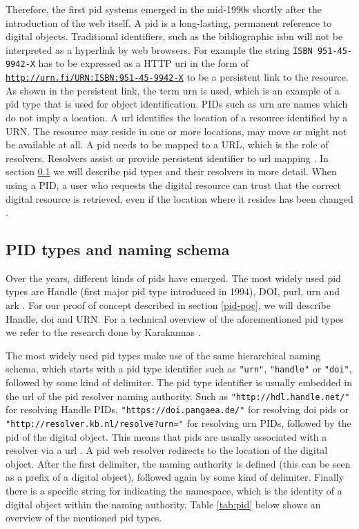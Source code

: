 Therefore, the first \gls{pid} systems emerged in the mid-1990s shortly after the introduction of the web itself. A \gls{pid} is a long-lasting, permanent reference to digital objects. Traditional identifiers, such as the bibliographic \gls{isbn} will not be interpreted as a hyperlink by web browsers. For example the string \texttt{ISBN 951-45-9942-X} has to be expressed as a HTTP \gls{uri} in the form of \texttt{\url{http://urn.fi/URN:ISBN:951-45-9942-X}} to be a persistent link to the resource. As shown in the persistent link, the term \gls{urn} is used, which is an example of a \gls{pid} type that is used for object identification. 
PIDs such as \gls{urn} are names which do not imply a location. A \gls{url} identifies the location of a resource identified by a URN. The resource may reside in one or more locations, may move or might not be available at all. A \gls{pid} needs to be mapped to a URL, which is the role of resolvers. Resolvers assist or provide persistent identifier to \gls{url} mapping \cite{rfc1737}. In section \ref{pid-types} we will describe \gls{pid} types and their resolvers in more detail. When using a PID, a user who requests the digital resource can trust that the correct digital resource is retrieved, even if the location where it resides has been changed \cite{pid-oview}.

\subsection{PID types and naming schema}\label{pid-types}
Over the years, different kinds of \glspl{pid} have emerged. The most widely used \gls{pid} types are Handle (first major \gls{pid} type introduced in 1994), DOI, \gls{purl}, \gls{urn} and \gls{ark} \cite{pid-oview, odin, hdl}. For our proof of concept described in section \ref{pid-poc}, we will describe Handle, \gls{doi} and URN. For a technical overview of the aforementioned \gls{pid} types we refer to the research done by Karakannas \cite{icn-bd}. 

The most widely used \gls{pid} types make use of the same hierarchical naming schema, which starts with a \gls{pid} type identifier such as \texttt{"urn"}, \texttt{"handle"} or \texttt{"doi"}, followed by some kind of delimiter. The \gls{pid} type identifier is usually embedded in the \gls{url} of the \gls{pid} resolver naming authority. Such as \texttt{"http://hdl.handle.net/"} for resolving Handle PIDs, \texttt{"https://doi.pangaea.de/"} for resolving \gls{doi} \glspl{pid} or \texttt{"http://resolver.kb.nl/resolve?urn="} for resolving \gls{urn} PIDs, followed by the \gls{pid} of the digital object. This means that \glspl{pid} are usually associated with a resolver via a \gls{url} \cite{ids, icn-bd}. A \gls{pid} web resolver redirects to the location of the digital object. After the first delimiter, the naming authority is defined (this can be seen as a prefix of a digital object), followed again by some kind of delimiter. Finally there is a specific string for indicating the namespace, which is the identity of a digital object within the naming authority. Table \ref{tab:pid} below shows an overview of the mentioned \gls{pid} types. 

